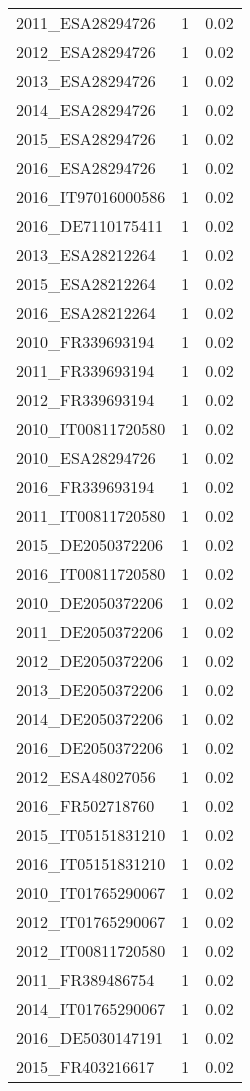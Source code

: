 \begin{table*}[htbp]
\begin{tabular}{lrr}
2011_ESA28294726 & 1 & 0.02 \\
2012_ESA28294726 & 1 & 0.02 \\
2013_ESA28294726 & 1 & 0.02 \\
2014_ESA28294726 & 1 & 0.02 \\
2015_ESA28294726 & 1 & 0.02 \\
2016_ESA28294726 & 1 & 0.02 \\
2016_IT97016000586 & 1 & 0.02 \\
2016_DE7110175411 & 1 & 0.02 \\
2013_ESA28212264 & 1 & 0.02 \\
2015_ESA28212264 & 1 & 0.02 \\
2016_ESA28212264 & 1 & 0.02 \\
2010_FR339693194 & 1 & 0.02 \\
2011_FR339693194 & 1 & 0.02 \\
2012_FR339693194 & 1 & 0.02 \\
2010_IT00811720580 & 1 & 0.02 \\
2010_ESA28294726 & 1 & 0.02 \\
2016_FR339693194 & 1 & 0.02 \\
2011_IT00811720580 & 1 & 0.02 \\
2015_DE2050372206 & 1 & 0.02 \\
2016_IT00811720580 & 1 & 0.02 \\
2010_DE2050372206 & 1 & 0.02 \\
2011_DE2050372206 & 1 & 0.02 \\
2012_DE2050372206 & 1 & 0.02 \\
2013_DE2050372206 & 1 & 0.02 \\
2014_DE2050372206 & 1 & 0.02 \\
2016_DE2050372206 & 1 & 0.02 \\
2012_ESA48027056 & 1 & 0.02 \\
2016_FR502718760 & 1 & 0.02 \\
2015_IT05151831210 & 1 & 0.02 \\
2016_IT05151831210 & 1 & 0.02 \\
2010_IT01765290067 & 1 & 0.02 \\
2012_IT01765290067 & 1 & 0.02 \\
2012_IT00811720580 & 1 & 0.02 \\
2011_FR389486754 & 1 & 0.02 \\
2014_IT01765290067 & 1 & 0.02 \\
2016_DE5030147191 & 1 & 0.02 \\
2015_FR403216617 & 1 & 0.02 \\

\end{tabular}
\end{table*}

